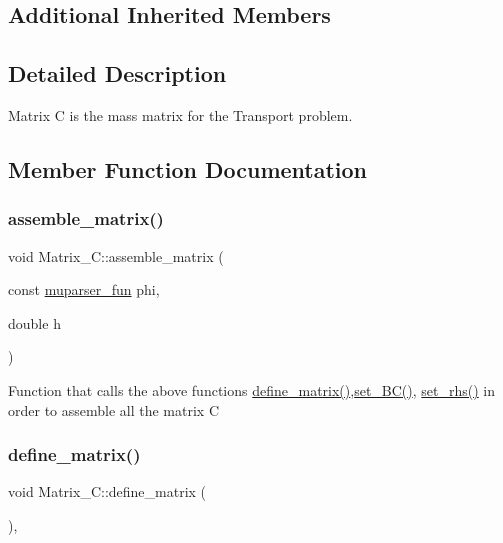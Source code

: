 \subsection*{Additional Inherited Members}


\subsection{Detailed Description}
Matrix C is the mass matrix for the Transport problem. 

\subsection{Member Function Documentation}
\mbox{\label{classMatrix__C_a7c8ebcbeec03800cd3d06a764406c0db}} 
\subsubsection{\texorpdfstring{assemble\+\_\+matrix()}{assemble\_matrix()}}
{\footnotesize\ttfamily void Matrix\+\_\+\+C\+::assemble\+\_\+matrix (\begin{DoxyParamCaption}\item[{const \hyperlink{classmuparser__fun}{muparser\+\_\+fun}}]{phi,  }\item[{double}]{h }\end{DoxyParamCaption})}

Function that calls the above functions \hyperlink{classMatrix__C_a062ab76d181505d1db2e391f02152376}{define\+\_\+matrix()},\hyperlink{classMatrix__C_a9235c2dbf2853fae4122251726a7efce}{set\+\_\+\+B\+C()}, \hyperlink{classMatrix__C_af305bfe533e702d629df3fb0409bc8d2}{set\+\_\+rhs()} in order to assemble all the matrix C \mbox{\label{classMatrix__C_a062ab76d181505d1db2e391f02152376}} 
\subsubsection{\texorpdfstring{define\+\_\+matrix()}{define\_matrix()}}
{\footnotesize\ttfamily void Matrix\+\_\+\+C\+::define\+\_\+matrix (\begin{DoxyParamCaption}{ }\end{DoxyParamCaption})\hspace{0.3cm}{\ttfamily [override]}, {\ttfamily [virtual]}}

